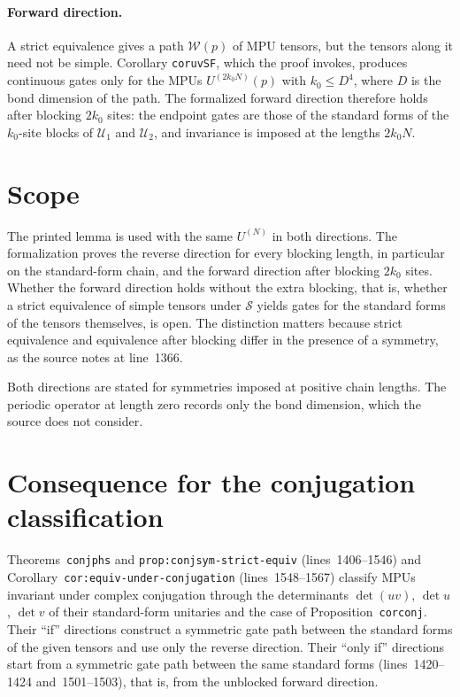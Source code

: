 \documentclass{article}
\begin{document}
\paragraph{Forward direction.} A strict equivalence gives a path
$\mathcal W(p)$ of MPU tensors, but the tensors along it need not be simple.
Corollary \texttt{coruvSF}, which the proof invokes, produces continuous gates
only for the MPUs $U^{(2k_0N)}(p)$ with $k_0\le D^4$, where $D$ is the bond
dimension of the path. The formalized forward direction therefore holds after
blocking $2k_0$ sites: the endpoint gates are those of the standard forms of
the $k_0$-site blocks of $\mathcal U_1$ and $\mathcal U_2$, and invariance
is imposed at the lengths $2k_0N$.

\section{Scope}

The printed lemma is used with the same $U^{(N)}$ in both directions. The
formalization proves the reverse direction for every blocking length, in
particular on the standard-form chain, and the forward direction after
blocking $2k_0$ sites. Whether the forward direction holds without the extra
blocking, that is, whether a strict equivalence of simple tensors under
$\mathcal S$ yields gates for the standard forms of the tensors themselves,
is open. The distinction matters because strict equivalence and equivalence
after blocking differ in the presence of a symmetry, as the source notes at
line~1366.

Both directions are stated for symmetries imposed at positive chain lengths.
The periodic operator at length zero records only the bond dimension, which
the source does not consider.

\section{Consequence for the conjugation classification}

Theorems~\texttt{conjphs} and \texttt{prop:conjsym-strict-equiv}
(lines~1406--1546) and Corollary~\texttt{cor:equiv-under-conjugation}
(lines~1548--1567) classify MPUs invariant under complex conjugation through
the determinants $\det(u v)$, $\det u$, $\det v$ of their standard-form
unitaries and the case of Proposition~\texttt{corconj}. Their ``if''
directions construct a symmetric gate path between the standard forms of the
given tensors and use only the reverse direction. Their ``only if'' directions
start from a symmetric gate path between the same standard forms
(lines~1420--1424 and~1501--1503), that is, from the unblocked forward
direction.
\end{document}
